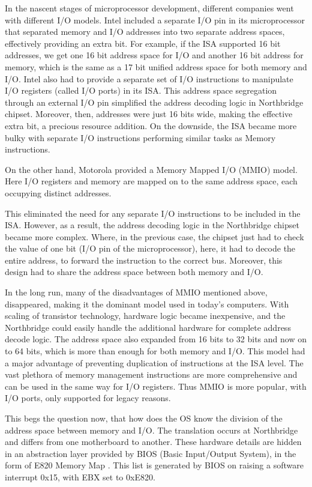 In the nascent stages of microprocessor development, different companies went with different I/O models. Intel included a separate I/O pin in its microprocessor that separated memory and I/O addresses into two separate address spaces, effectively providing an extra bit. For example, if the ISA supported 16 bit addresses, we get one 16 bit address space for I/O and another 16 bit address for memory, which is the same as a 17 bit unified address space for both memory and I/O. Intel also had to provide a separate set of I/O instructions to manipulate I/O registers (called I/O ports) in its ISA. This address space segregation through an external I/O pin simplified the address decoding logic in Northbridge chipset. Moreover, then, addresses were just 16 bits wide, making the effective extra bit, a precious resource addition. On the downside, the ISA became more bulky with separate I/O instructions performing similar tasks as Memory instructions.

On the other hand, Motorola provided a Memory Mapped I/O (MMIO) model. Here I/O registers and memory are mapped on to the same address space, each occupying distinct addresses.

This eliminated the need for any separate I/O instructions to be included in the ISA. However, as a result, the address decoding logic in the Northbridge chipset became more complex. Where, in the previous case, the chipset just had to check the value of one bit (I/O pin of the microprocessor), here, it had to decode the entire address, to forward the instruction to the correct bus. Moreover, this design had to share the address space between both memory and I/O.

In the long run, many of the disadvantages of MMIO mentioned above, disappeared, making it the dominant model used in today's computers. With scaling of transistor technology, hardware logic became inexpensive, and the Northbridge could easily handle the additional hardware for complete address decode logic. The address space also expanded from 16 bits to 32 bits and now on to 64 bits, which is more than enough for both memory and I/O. This model had a major advantage of preventing duplication of instructions at the ISA level. The vast plethora of memory management instructions are more comprehensive and can be used in the same way for I/O registers. Thus MMIO is more popular, with I/O ports, only supported for legacy reasons. 

This begs the question now, that how does the OS know the division of the address space between memory and I/O. The translation occurs at Northbridge and differs from one motherboard to another. These hardware details are hidden in an abstraction layer provided by BIOS (Basic Input/Output System), in the form of E820 Memory Map \cite{acpi_manual}. This list is generated by BIOS on raising a software interrupt 0x15, with EBX set to 0xE820. 


